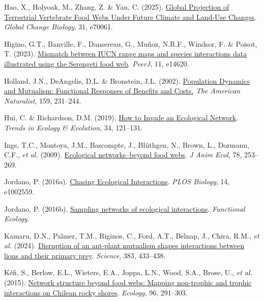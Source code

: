 \documentclass[
]{article}
\newlength{\cslhangindent}
\newenvironment{CSLReferences}[2] %
 {\begin{list}{}{%
  \setlength{\itemindent}{0pt}
  \setlength{\leftmargin}{0pt}
  \setlength{\parsep}{0pt}
  \ifodd #1
   \setlength{\leftmargin}{\cslhangindent}
   \setlength{\itemindent}{-1\cslhangindent}
  \fi
  \setlength{\itemsep}{#2\baselineskip}}}
 {\end{list}}
\begin{document}
\begin{CSLReferences}{1}{0}
Hao, X., Holyoak, M., Zhang, Z. \& Yan, C. (2025).
\href{https://doi.org/10.1111/gcb.70061}{Global {Projection} of
{Terrestrial Vertebrate Food Webs Under Future Climate} and {Land-Use
Changes}}. \emph{Global Change Biology}, 31, e70061.

Higino, G.T., Banville, F., Dansereau, G., Muñoz, N.R.F., Windsor, F. \&
Poisot, T. (2023). \href{https://doi.org/10.7717/peerj.14620}{Mismatch
between {IUCN} range maps and species interactions data illustrated
using the {Serengeti} food web}. \emph{PeerJ}, 11, e14620.

Holland, J.N., DeAngelis, D.L. \& Bronstein, J.L. (2002).
\href{https://doi.org/10.1086/338510}{Population {Dynamics} and
{Mutualism}: {Functional Responses} of {Benefits} and {Costs}.}
\emph{The American Naturalist}, 159, 231--244.

Hui, C. \& Richardson, D.M. (2019).
\href{https://doi.org/10.1016/j.tree.2018.11.003}{How to {Invade} an
{Ecological Network}}. \emph{Trends in Ecology \& Evolution}, 34,
121--131.

Ings, T.C., Montoya, J.M., Bascompte, J., Blüthgen, N., Brown, L.,
Dormann, C.F., \emph{et al.} (2009).
\href{https://doi.org/10.1111/j.1365-2656.2008.01460.x}{Ecological
networks--beyond food webs}. \emph{J Anim Ecol}, 78, 253--269.

Jordano, P. (2016a).
\href{https://doi.org/10.1371/journal.pbio.1002559}{Chasing {Ecological
Interactions}}. \emph{PLOS Biology}, 14, e1002559.

Jordano, P. (2016b).
\href{https://doi.org/10.1111/1365-2435.12763}{Sampling networks of
ecological interactions}. \emph{Functional Ecology}.

Kamaru, D.N., Palmer, T.M., Riginos, C., Ford, A.T., Belnap, J., Chira,
R.M., \emph{et al.} (2024).
\href{https://doi.org/10.1126/science.adg1464}{Disruption of an
ant-plant mutualism shapes interactions between lions and their primary
prey}. \emph{Science}, 383, 433--438.

Kéfi, S., Berlow, E.L., Wieters, E.A., Joppa, L.N., Wood, S.A., Brose,
U., \emph{et al.} (2015).
\href{https://doi.org/10.1890/13-1424.1}{Network structure beyond food
webs: Mapping non-trophic and trophic interactions on {Chilean} rocky
shores}. \emph{Ecology}, 96, 291--303.


\end{CSLReferences}
\end{document}
